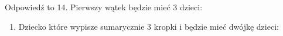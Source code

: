 Odpowiedź to 14. Pierwszy wątek będzie mieć 3 dzieci:
\begin{enumerate}
    \item Dziecko które wypisze sumarycznie 3 kropki i będzie mieć dwójkę dzieci: 
\end{enumerate}